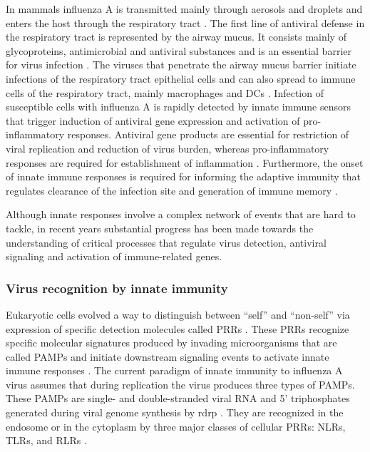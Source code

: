 	In mammals influenza A is transmitted mainly through aerosols and droplets and enters the host through the respiratory tract \parencite{Brankston2007}. The first line of antiviral defense in the respiratory tract is represented by the airway mucus. It consists mainly of glycoproteins, antimicrobial and antiviral substances and is an essential barrier for virus infection \parencite{Thornton2008, Nicholas2006}. The viruses that penetrate the airway mucus barrier initiate infections of the respiratory tract epithelial cells and can also spread to immune cells of the respiratory tract, mainly macrophages and \glspl{DC} \parencite{Perrone2008, Bender1998}. Infection of susceptible cells with influenza A is rapidly detected by innate immune sensors that trigger induction of antiviral gene expression and activation of pro-inflammatory responses. Antiviral gene products are essential for restriction of viral replication and reduction of virus burden, whereas pro-inflammatory responses are required for establishment of inflammation \parencite{Iwasaki2014}. Furthermore, the onset of innate immune responses is required for informing the adaptive immunity that regulates clearance of the infection site and generation of immune memory \parencite{Iwasaki2010}. 
	
	Although innate responses involve a complex network of events that are hard to tackle, in recent years substantial progress has been made towards the understanding of critical processes that regulate virus detection, antiviral signaling and activation of immune-related genes.
	
		\subsubsection{Virus recognition by innate immunity}
		
		Eukaryotic cells evolved a way to distinguish between ``self'' and ``non-self'' via expression of specific detection molecules called \glspl{PRR} \parencite{Janeway2002}. These \glspl{PRR} recognize specific molecular signatures produced by invading microorganisms that are called  \glspl{PAMP} and initiate downstream signaling events to activate innate immune responses \parencite{Janeway1989}. The current paradigm of innate immunity to influenza A virus assumes that during replication the virus produces three types of  \glspl{PAMP}. These \glspl{PAMP} are single- and double-stranded viral RNA and 5' triphosphates generated during viral genome synthesis by \gls{rdrp} \parencite{Guillot2005, Hornung2006, Kato2006, Lund2004}. They are recognized in the endosome or in the cytoplasm by three major classes of cellular \glspl{PRR}: \glspl{NLR}, \glspl{TLR}, and \glspl{RLR} \parencite{Iwasaki2014}. 
		
